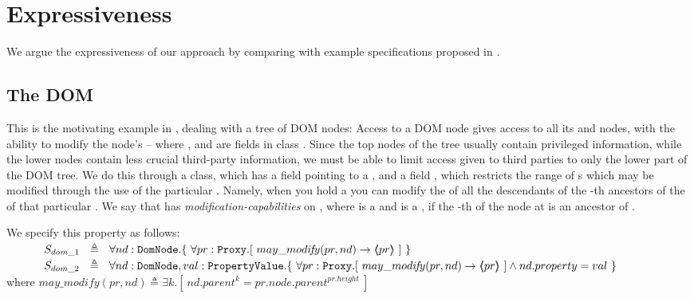 \section{Expressiveness} 

We argue the expressiveness of our approach by comparing with example specifications  proposed in \cite{OOPSLA22}.

 

\subsection{The DOM}  %
\label{ss:DOM}
This is the motivating example in \cite{dd},
dealing with a tree of DOM nodes: Access to a DOM node
gives access to all its  and  nodes, with the ability to
modify the node's  -- where  ,  and 
are fields in class . Since the top nodes of the tree
usually contain privileged information, while the lower nodes contain
less crucial third-party information, we must be able to limit 
 access given to third parties to only the lower part of the DOM tree. We do this through a  class, which has a field  pointing to a , and a field , which restricts the range of s which may be modified through the use of the particular . Namely, when you hold a   you can modify the  of all the descendants of the    -th ancestors of the  of that particular .  We say that
 has \emph{modification-capabilities} on , where  is
a   and  is a , if the -th  
of the node at  is an ancestor of .

We specify this property as follows:
\\
$\strut \SPSP  S_{dom\_1}\ \  \triangleq \ \ \TwoStatesN{ nd:\prg{DomNode}}{\  \forall pr:\prg{Proxy}.[ \ may\_modi\!f\!y(pr, nd) \rightarrow \inside{pr}\  ] \ }$ 
\\
$\strut \SPSP  S_{dom\_2}\ \  \triangleq \ \ \TwoStatesN{ nd:\prg{DomNode}, val:\prg{PropertyValue}}
	{\  \forall pr:\prg{Proxy}.[ \ may\_modi\!f\!y(pr, nd) \rightarrow \inside{pr}\  ]  \wedge nd.property = val \ }$ 
\\
where $may\_modi\!f\!y(pr, nd) \triangleq \exists k. [ \  nd.parent^k=pr.node.parent^{pr.height}\ ]$


